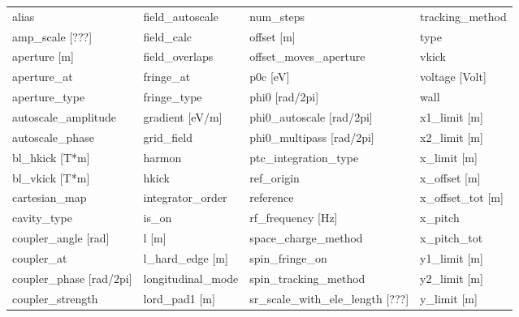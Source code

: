  \begin{tabular}{llll} \toprule
alias                          & field_autoscale                & num_steps                      & tracking_method                \\
amp_scale [???]                & field_calc                     & offset [m]                     & type                           \\
aperture [m]                   & field_overlaps                 & offset_moves_aperture          & vkick                          \\
aperture_at                    & fringe_at                      & p0c [eV]                       & voltage [Volt]                 \\
aperture_type                  & fringe_type                    & phi0 [rad/2pi]                 & wall                           \\
autoscale_amplitude            & gradient [eV/m]                & phi0_autoscale [rad/2pi]       & x1_limit [m]                   \\
autoscale_phase                & grid_field                     & phi0_multipass [rad/2pi]       & x2_limit [m]                   \\
bl_hkick [T*m]                 & harmon                         & ptc_integration_type           & x_limit [m]                    \\
bl_vkick [T*m]                 & hkick                          & ref_origin                     & x_offset [m]                   \\
cartesian_map                  & integrator_order               & reference                      & x_offset_tot [m]               \\
cavity_type                    & is_on                          & rf_frequency [Hz]              & x_pitch                        \\
coupler_angle [rad]            & l [m]                          & space_charge_method            & x_pitch_tot                    \\
coupler_at                     & l_hard_edge [m]                & spin_fringe_on                 & y1_limit [m]                   \\
coupler_phase [rad/2pi]        & longitudinal_mode              & spin_tracking_method           & y2_limit [m]                   \\
coupler_strength               & lord_pad1 [m]                  & sr_scale_with_ele_length [???] & y_limit [m]                    \\

\end{tabular}
